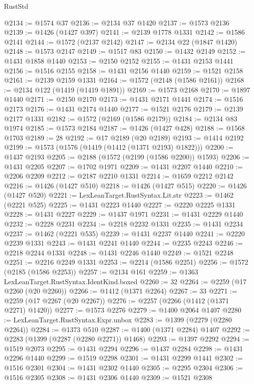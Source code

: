 \begin{lexlean}{RustStd}
\begin{coremodule}
@2134 := @1574 @37
@2136 := @2134 @37 @1420
@2137 := @1573 @2136
@2139 := @1426 (@1427 @397)
@2141 := @2139 @1778 @1331
@2142 := @1586 @2141
@2144 := @1572 (@2137 @2142)
@2147 := @2134 @22 (@1847 @1420)
@2148 := @1573 @2147
@2149 := @1517 @83
@2150 := @1432 @2149
@2152 := @1431 @1858 @1440
@2153 := @2150 @2152
@2155 := @1431 @2153 @1441
@2156 := @1516 @2155
@2158 := @1431 @2156 @1440
@2159 := @1521 @2158
@2161 := @2139 @2159 @1331
@2164 := @1572 (@2148 (@1586 @2161))
@2168 := @2134 @122 (@1419 (@1419 @1891))
@2169 := @1573 @2168
@2170 := @1897 @1440
@2171 := @2150 @2170
@2173 := @1431 @2171 @1441
@2174 := @1516 @2173
@2176 := @1431 @2174 @1440
@2177 := @1521 @2176
@2179 := @2139 @2177 @1331
@2182 := @1572 (@2169 (@1586 @2179))
@2184 := @2134 @83 @1974
@2185 := @1573 @2184
@2187 := @1426 (@1427 @428)
@2188 := @1568 @1703
@2189 := 28
@2192 := @17 @2189 (@20 @2189)
@2193 := @1414 @2192
@2199 := @1573 (@1576 (@1419 (@1412 (@1371 @2193) @1822)))
@2200 := @1437 @2193
@2205 := @2188 (@1572 (@2199 (@1586 @2200)) @1593)
@2206 := @1431 @2205
@2207 := @1702 @1971
@2209 := @1431 @2207 @1440
@2210 := @2206 @2209
@2212 := @2187 @2210 @1331
@2214 := @1659 @2212 @2142
@2216 := @1426 (@1427 @510)
@2218 := @1426 (@1427 @515)
@2220 := @1426 (@1427 @520)
@2221 := LexLeanTarget.RustSyntax.Lit.str
@2223 := @1462 (@2221 @525)
@2225 := @1431 @2223 @1440
@2227 := @2220 @2225 @1331
@2228 := @1431 @2227
@2229 := @1437 @1971
@2231 := @1431 @2229 @1440
@2232 := @2228 @2231
@2234 := @2218 @2232 @1331
@2235 := @1431 @2234
@2237 := @1462 (@2221 @535)
@2239 := @1431 @2237 @1440
@2241 := @2220 @2239 @1331
@2243 := @1431 @2241 @1440
@2244 := @2235 @2243
@2246 := @2218 @2244 @1331
@2248 := @1431 @2246 @1440
@2249 := @1521 @2248
@2251 := @2216 @2249 @1331
@2253 := @2214 (@1586 @2251)
@2256 := @1572 (@2185 (@1586 @2253))
@2257 := @2134 @161
@2259 := @1363 LexLeanTarget.RustSyntax.IdentKind.boxed
@2260 := 32
@2264 := @2259 (@17 @2260 (@20 @2260))
@2266 := @1412 (@1371 @2264)
@2267 := 33
@2271 := @2259 (@17 @2267 (@20 @2267))
@2276 := @2257 (@2266 (@1412 (@1371 @2271) @1420))
@2277 := @1573 @2276
@2279 := @1400 @2064 @1407
@2280 := LexLeanTarget.RustSyntax.Expr.unbox
@2283 := @1399 (@2279 (@2280 @2264))
@2284 := @1373 @510
@2287 := @1400 (@1371 @2284) @1407
@2292 := @2283 (@1399 (@2287 (@2280 @2271)) @1468)
@2293 := @1397 @2292
@2294 := @1519 @2073
@2295 := @1431 @2294
@2296 := @1437 @2284
@2298 := @1431 @2296 @1440
@2299 := @1519 @2298
@2301 := @1431 @2299 @1441
@2302 := @1516 @2301
@2304 := @1431 @2302 @1440
@2305 := @2295 @2304
@2306 := @1516 @2305
@2308 := @1431 @2306 @1440
@2309 := @1521 @2308

\end{coremodule}
\end{lexlean}

